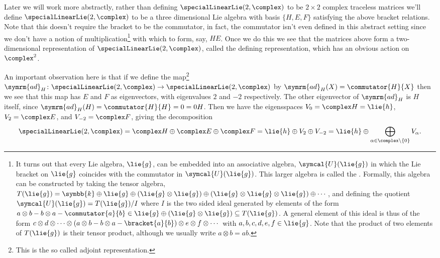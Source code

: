 \documentclass[fleqn]{NotesClass}
\renewcommand{\field}{\symbb{k}}
\newcommand{\ad}{\symrm{ad}}
\begin{document}
    Later we will work more abstractly, rather than defining \(\specialLinearLie(2, \complex)\) to be \(2 \times 2\) complex traceless matrices we'll define \(\specialLinearLie(2, \complex)\) to be a three dimensional Lie algebra with basis \(\{H, E, F\}\) satisfying the above bracket relations.
    Note that this doesn't require the bracket to be the commutator, in fact, the commutator isn't even defined in this abstract setting since we don't have a notion of multiplication\footnote{It turns out that every Lie algebra, \(\lie{g}\), can be embedded into an associative algebra, \(\symcal{U}(\lie{g})\) in which the Lie bracket on \(\lie{g}\) coincides with the commutator in \(\symcal{U}(\lie{g})\). This larger algebra is called the . Formally, this algebra can be constructed by taking the tensor algebra, \(T(\lie{g}) = \field \oplus \lie{g} \oplus (\lie{g} \otimes \lie{g}) \oplus (\lie{g} \otimes \lie{g} \otimes \lie{g}) \oplus \dotsb\), and defining the quotient \(\symcal{U}(\lie{g}) = T(\lie{g})/I\) where \(I\) is the two sided ideal generated by elements of the form \(a \otimes b - b \otimes a - \commutator{a}{b} \in \lie{g} \oplus (\lie{g} \otimes \lie{g}) \subseteq T(\lie{g})\). A general element of this ideal is thus of the form \(c \otimes d \otimes \dotsb \otimes (a \otimes b - b \otimes a - \bracket{a}{b}) \otimes e \otimes f \otimes \dotsb\) with \(a, b, c, d, e, f \in \lie{g}\). Note that the product of two elements of \(T(\lie{g})\) is their tensor product, although we usually write \(a \otimes b = ab\).} with which to form, say, \(HE\).
    Once we do this we see that the matrices above form a two-dimensional representation of \(\specialLinearLie(2, \complex)\), called the defining representation, which has an obvious action on \(\complex^2\).
    
    An important observation here is that if we define the map\footnote{This is the so called adjoint representation.} \(\ad_H \colon \specialLinearLie(2, \complex) \to \specialLinearLie(2, \complex)\) by \(\ad_H(X) = \commutator{H}{X}\) then we see that this map has \(E\) and \(F\) as eigenvectors, with eigenvalues \(2\) and \(-2\) respectively. %
    The other eigenvector of \(\ad_H\) is \(H\) itself, since \(\ad_H(H) = \commutator{H}{H} = 0 = 0H\).
    Then we have the eigensspaces \(V_0 = \complex H = \lie{h}\), \(V_2 = \complex E\), and \(V_{-2} = \complex F\), giving the decomposition
    \begin{equation}
        \specialLinearLie(2, \complex) = \complex H \oplus \complex E \oplus \complex F = \lie{h} \oplus V_2 \oplus V_{-2} = \lie{h} \oplus \bigoplus_{\alpha \in \complex \setminus \{0\}} V_{\alpha}.
    \end{equation}
    
\end{document}
